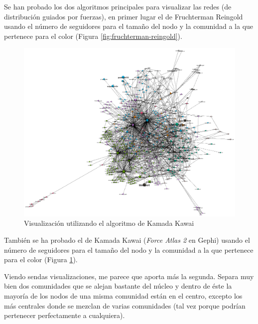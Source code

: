 Se han probado los dos algoritmos principales para visualizar las redes (de distribución guiados por fuerzas), en primer lugar el de Fruchterman Reingold usando el número de seguidores para el tamaño del nodo y la comunidad a la que pertenece para el color (Figura \ref{fig:fruchterman-reingold}).
	
\begin{figure}[H]
	\centering
	\includegraphics[width=14cm]{img/kamada-kawai}
	\caption{Visualización utilizando el algoritmo de Kamada Kawai}
	\label{fig:kamada-kawai}
\end{figure}

También se ha probado el de Kamada Kawai (\textit{Force Atlas 2} en Gephi) usando el número de seguidores para el tamaño del nodo y la comunidad a la que pertenece para el color (Figura \ref{fig:kamada-kawai}).

Viendo sendas visualizaciones, me parece que aporta más la segunda. Separa muy bien dos comunidades que se alejan bastante del núcleo y dentro de éste la mayoría de los nodos de una misma comunidad están en el centro, excepto los más centrales donde se mezclan de varias comunidades (tal vez porque podrían pertenecer perfectamente a cualquiera).

